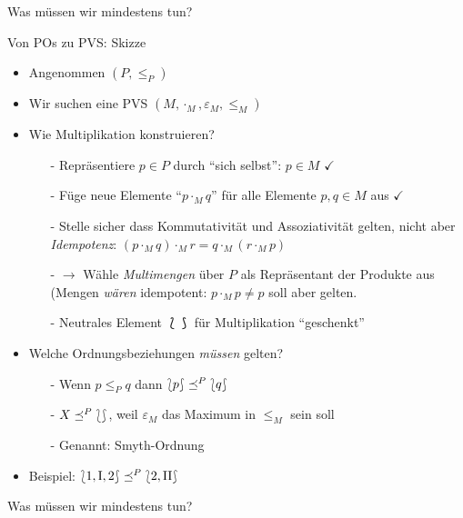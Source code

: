 \begin{frame}{Was müssen wir mindestens tun?}

\end{frame}

\begin{frame}{Von POs zu PVS: Skizze}

{
\Large
\begin{itemize}
\item Angenommen $(P, \leq_P)$ \pause 
\item Wir suchen eine PVS $(M, \cdot_M, \varepsilon_M, \leq_M)$ \pause
\item Wie \alert{Multiplikation} konstruieren?
\begin{itemize}
\item[-] Repräsentiere $p \in P$ durch ``sich selbst'': $p \in M$ $\checkmark$ \pause 
\item[-] Füge neue Elemente ``$p \cdot_M q$'' für alle Elemente $p,q \in M$ aus $\checkmark$ \pause
\item[-] Stelle sicher dass Kommutativität und Assoziativität gelten, nicht aber \emph{Idempotenz}: $(p \cdot_M q) \cdot_M r  = q \cdot_M (r \cdot_M p)$   \pause
\item[-] $\rightarrow$ Wähle \emph{Multimengen} über $P$ als Repräsentant der Produkte aus (Mengen \emph{wären} idempotent: $p \cdot_M p \neq p$ soll aber gelten. \pause
\item[-] Neutrales Element $\lbag \rbag$ für Multiplikation ``geschenkt''
\end{itemize}
\vspace*{2ex}
\pause
\item Welche Ordnungsbeziehungen \emph{müssen} gelten? \pause
\begin{itemize}
\item[-] Wenn $p \leq_P q$ dann $\lbag p \rbag \smytheq{P} \lbag q \rbag$ 
\item[-] $X \smytheq{P} \lbag  \rbag$, weil $\varepsilon_M$ das Maximum in $\leq_M$ sein soll
\item[-] Genannt: \alert{Smyth-Ordnung}
\end{itemize}
\item Beispiel: $\lbag 1, \RN{1}, 2 \rbag \smytheq{P} \lbag 2, \RN{2} \rbag$
\end{itemize}
}
\end{frame}

\begin{frame}{Was müssen wir mindestens tun?}

\begin{center} 

\end{center}
\end{frame}



